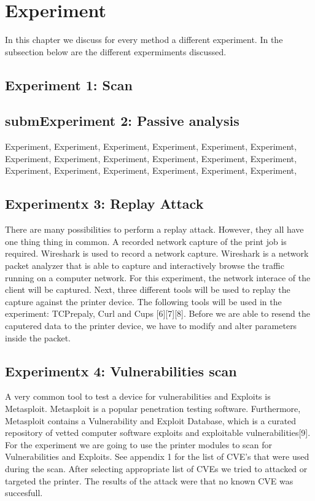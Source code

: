 \documentclass[a4paper]{article}
\begin{document}
\section{Experiment} 
In this chapter we discuss for every method a different experiment. In the subsection below are the different expermiments discussed.

\subsection{Experiment 1: Scan}


\subsection{submExperiment 2: Passive analysis}
Experiment, Experiment, Experiment, Experiment, Experiment, Experiment, Experiment, Experiment, Experiment, Experiment, Experiment, Experiment, Experiment, Experiment, Experiment, Experiment, Experiment, Experiment,

\subsection{Experimentx 3: Replay Attack }
There are many possibilities to perform a replay attack. However, they all
have one thing thing in common. A recorded network capture of the print
job is required. Wireshark is used to record a network capture.
Wireshark is a network packet analyzer that is able to capture and
interactively browse the traffic running on a computer network. For this
experiment,  the network interace of the client will be captured. Next,
three different tools will be used to replay the capture against the
printer device. The following tools will be used in the experiment:
TCPrepaly, Curl and Cups [6][7][8]. Before we are able to resend the
caputered data to the printer device, we have to modify and alter
parameters inside the packet.



\subsection{Experimentx 4: Vulnerabilities scan }
A very common tool to test a device for vulnerabilities and Exploits is
Metasploit. Metasploit is a popular penetration testing software.
Furthermore, Metasploit contains a Vulnerability and Exploit Database,
which is a curated repository of vetted computer software exploits and
exploitable vulnerabilities[9]. For the experiment we are going to use the
printer modules to scan for Vulnerabilities and Exploits. See appendix 1
for the list of CVE's that were used during the scan. After selecting
appropriate list of CVEs we tried to attacked or targeted the printer. The
results of the attack were that no known CVE was succesfull. 
\end{document}
